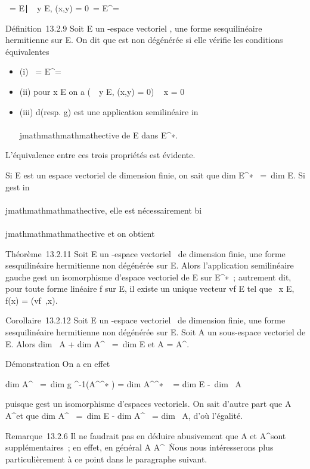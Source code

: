 \mathrmKer~\phi =
\x \in
E∣\forall~~y \in E, \phi(x,y) =
0\ = E^\bot =\
\mathrmKerd \phi

Définition~13.2.9 Soit E un -espace vectoriel , \phi une forme
sesquilinéaire hermitienne sur E. On dit que \phi est non dégénérée si elle
vérifie les conditions équivalentes

\begin{itemize}
\itemsep1pt\parskip0pt
\item
  (i) \mathrmKer~\phi =
  E^\bot = \0\
\item
  (ii) pour x \in E on a \left
  (\forall~~y \in E, \phi(x,y) = 0\right ) \rigtharrow~
  x = 0
\item
  (iii) d\phi (resp. g\phi) est une application
  semilinéaire in\\\\jmathmathmathmathective de E dans E^∗.
\end{itemize}

L'équivalence entre ces trois propriétés est évidente.

Si E est un espace vectoriel de dimension finie, on sait que
dim E^∗~ =\
dim E. Si g\phi est in\\\\jmathmathmathmathective, elle est nécessairement
bi\\\\jmathmathmathmathective et on obtient

Théorème~13.2.11 Soit E un \mathbb{C}-espace vectoriel ~de dimension finie, \phi une
forme sesquilinéaire hermitienne non dégénérée sur E. Alors
l'application semilinéaire gauche g\phi est un isomorphisme
d'espace vectoriel de E sur E^∗~; autrement dit, pour toute
forme linéaire f sur E, il existe un unique vecteur vf \in E tel
que \forall~x \in E, f(x) = \phi(vf~,x).

Corollaire~13.2.12 Soit E un \mathbb{C}-espace vectoriel ~de dimension finie, \phi
une forme sesquilinéaire hermitienne non dégénérée sur E. Soit A un
sous-espace vectoriel de E. Alors dim~ A
+ dim A^\bot~ =\
dim E et A = A^\bot\bot.

Démonstration On a en effet

dim A^\bot~ =\
dim g \phi^-1(A^\bot^∗ )
= dim A^\bot^∗ ~
= dim E -\ dim~ A

puisque g\phi est un isomorphisme d'espaces vectoriels. On sait
d'autre part que A \subset~ A^\bot\bot et que
dim A^\bot\bot~ =\
dim E - dim A^\bot~
= dim~ A, d'où l'égalité.

Remarque~13.2.6 Il ne faudrait pas en déduire abusivement que A et
A^\bot sont supplémentaires~; en effet, en général A \bigcap
A^\bot\neq~\0\.
Nous nous intéresserons plus particulièrement à ce point dans le
paragraphe suivant.

